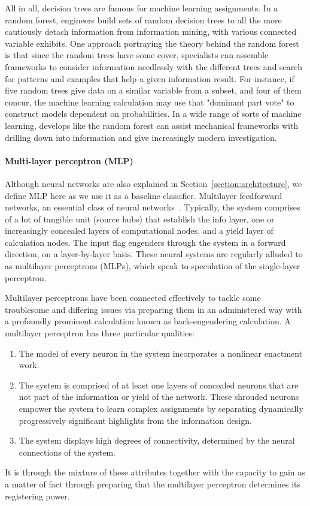 All in all, decision trees are famous for machine learning assignments. In a random forest, engineers build sets of random decision trees to all the more cautiously detach information from information mining, with various connected variable exhibits. One approach portraying the theory behind the random forest is that since the random trees have some cover, specialists can assemble frameworks to consider information needlessly with the different trees and search for patterns and examples that help a given information result. For instance, if five random trees give data on a similar variable from a subset, and four of them concur, the machine learning calculation may use that "dominant part vote" to construct models dependent on probabilities. In a wide range of sorts of machine learning, develops like the random forest can assist mechanical frameworks with drilling down into information and give increasingly modern investigation.

\paragraph{Multi-layer perceptron (MLP)}
Although neural networks are also explained in Section~\ref{section:architecture}, we define MLP here as we use it as a baseline classifier. 
Multilayer feedforward networks, an essential class of neural networks~\cite{haykin1994neural}. Typically, the system comprises of a lot of tangible unit (source hubs) that establish the info layer, one or increasingly concealed layers of computational nodes, and a yield layer of calculation nodes. The input flag engenders through the system in a forward direction, on a layer-by-layer basis. These neural systems are regularly alluded to as multilayer perceptrons (MLPs), which speak to speculation of the single-layer perceptron. 

Multilayer perceptrons have been connected effectively to tackle some troublesome and differing issues via preparing them in an administered way with a profoundly prominent calculation known as back-engendering calculation. 
A multilayer perceptron has three particular qualities: 
\begin{enumerate}
    \item The model of every neuron in the system incorporates a nonlinear enactment work. 

    \item The system is comprised of at least one layers of concealed neurons that are not part of the information or yield of the network. These shrouded neurons empower the system to learn complex assignments by separating dynamically progressively significant highlights from the information design. 

    \item The system displays high degrees of connectivity, determined by the neural connections of the system. 
\end{enumerate}
It is through the mixture of these attributes together with the capacity to gain as a matter of fact through preparing that the multilayer perceptron determines its registering power.

